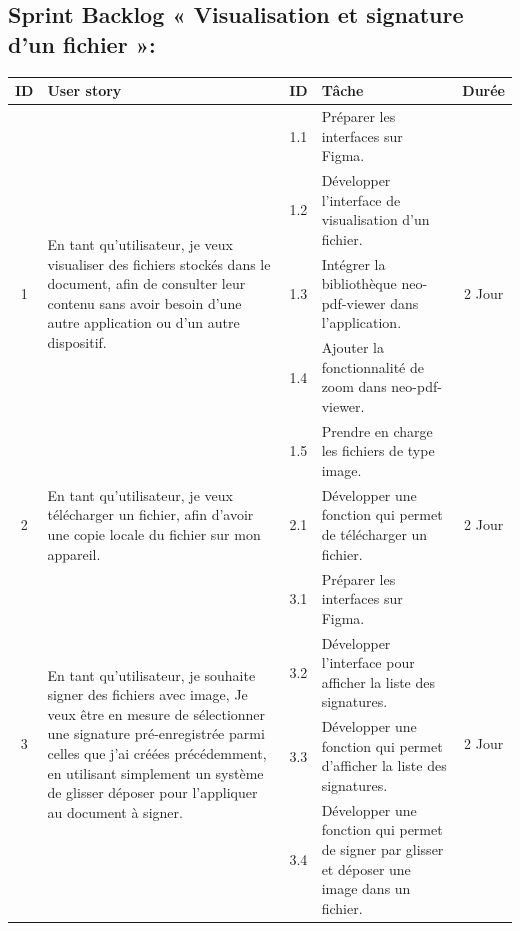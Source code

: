 \subsection{Sprint Backlog « Visualisation et signature d'un fichier »:}

\begin{adjustwidth}{-1cm}{}
    
    \begin{longtable}{|c|p{6cm}|c|p{6cm}|c|}
      \hline
      \textbf{ID} & \textbf{User story} & \textbf{ID}  & \textbf{Tâche} & \textbf{Durée} \\
      \hline
      \multirow{5}{*}{1} & \multirow{5}{6cm}{En tant qu'utilisateur, je veux visualiser des fichiers stockés dans le document, afin de consulter leur contenu sans avoir besoin d'une autre application ou d'un autre dispositif.} & 1.1 & Préparer les interfaces sur Figma. & \multirow{5}{*}{2 Jour} \\
      \cline{3-4}
      & & 1.2 & Développer l'interface de visualisation d'un fichier. & \\
      \cline{3-4}
      & & 1.3 & Intégrer la bibliothèque neo-pdf-viewer dans l'application. & \\
      \cline{3-4}
      & & 1.4 & Ajouter la fonctionnalité de zoom dans neo-pdf-viewer. & \\
      \cline{3-4}
      & & 1.5 & Prendre en charge les fichiers de type image. & \\
      \cline{1-5}

      \multirow{1}{*}{2} & En tant qu'utilisateur, je veux télécharger un fichier, afin d'avoir une copie locale du fichier sur mon appareil. & 2.1 & Développer une fonction qui permet de télécharger un fichier. & \multirow{1}{*}{2 Jour} \\
      \cline{1-5}

      \multirow{4}{*}{3} & \multirow{4}{6cm}{En tant qu'utilisateur, je souhaite signer des fichiers avec image, Je veux être en mesure de sélectionner une signature pré-enregistrée parmi celles que j'ai créées précédemment, en utilisant simplement un système de glisser déposer pour l'appliquer au document à signer.}& 3.1 & Préparer les interfaces sur Figma. & \multirow{4}{*}{2 Jour} \\
      \cline{3-4}
      & & 3.2 & Développer l'interface pour afficher la liste des signatures. & \\
      \cline{3-4}
      & & 3.3 & Développer une fonction qui permet d'afficher la liste des signatures. & \\
      \cline{3-4}
      & & 3.4 & Développer une fonction qui permet de signer par glisser et déposer une image dans un fichier. & \\
      \cline{1-5}


\end{longtable}
\end{adjustwidth}

